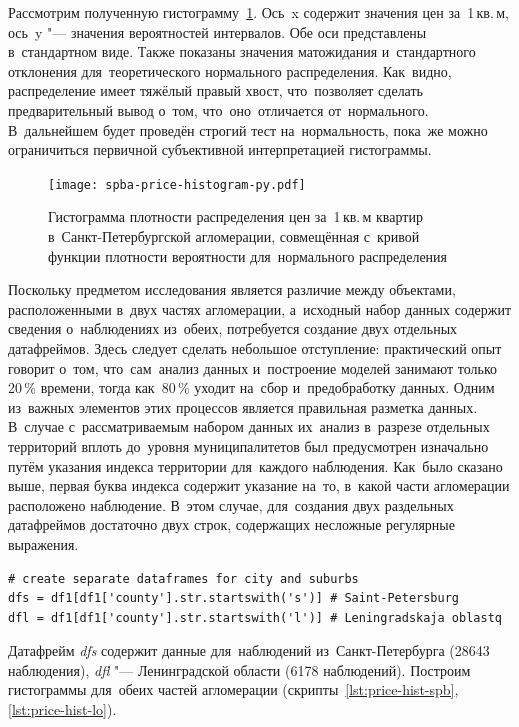\documentclass[]{scrreprt}
\begin{document}
Рассмотрим полученную гистограмму~\ref{fig:spba-prices-hist}. Ось~x содержит значения цен за~1\,кв.\,м, ось~y "--- значения вероятностей интервалов. Обе оси представлены в~стандартном виде. Также показаны значения матожидания и~стандартного отклонения для~теоретического нормального распределения. Как~видно, распределение имеет тяжёлый правый хвост, что~позволяет сделать предварительный вывод о~том, что~оно~отличается от~нормального. В~дальнейшем будет проведён строгий тест на~нормальность, пока~же можно ограничиться первичной субъективной интерпретацией гистограммы.
%
\begin{figure}[ht]
	\centering
	\texttt{[image: spba-price-histogram-py.pdf]}
	\caption{Гистограмма плотности распределения цен за~1\,кв.\,м квартир в~Санкт-Петербургской агломерации, совмещённая с~кривой функции плотности вероятности для~нормального распределения}
	\label{fig:spba-prices-hist}
\end{figure}
%
Поскольку предметом исследования является различие между объектами, расположенными в~двух частях агломерации, а~исходный набор данных содержит сведения о~наблюдениях из~обеих, потребуется создание двух отдельных датафреймов. Здесь следует сделать небольшое отступление: практический опыт говорит о~том, что~сам~анализ данных и~построение моделей занимают только 20\,\% времени, тогда как~80\,\% уходит на~сбор и~предобработку данных. Одним из~важных элементов этих процессов является правильная разметка данных. В~случае с~рассматриваемым набором данных их~анализ в~разрезе отдельных территорий вплоть до~уровня муниципалитетов был предусмотрен изначально путём указания индекса территории для~каждого наблюдения. Как~было сказано выше, первая буква индекса содержит указание на~то, в~какой части агломерации расположено наблюдение. В~этом случае, для~создания двух раздельных датафреймов достаточно двух строк, содержащих несложные регулярные выражения.
%
\begin{lstlisting}[float, caption = Создание отдельных датафреймов для~Санкт-Петербурга и~Ленинградской области, firstnumber=1, label= lst:create-two-separate-df-for-S-Pb-LO]
# create separate dataframes for city and suburbs
dfs = df1[df1['county'].str.startswith('s')] # Saint-Petersburg
dfl = df1[df1['county'].str.startswith('l')] # Leningradskaja oblastq
\end{lstlisting}
%
Датафрейм \emph{dfs} содержит данные для~наблюдений из~Санкт-Петербурга (28643 наблюдения), \emph{dfl} "--- Ленинградской области (6178 наблюдений). Построим гистограммы для~обеих частей агломерации (скрипты~\ref{lst:price-hist-spb}, \ref{lst:price-hist-lo}).
\end{document}
